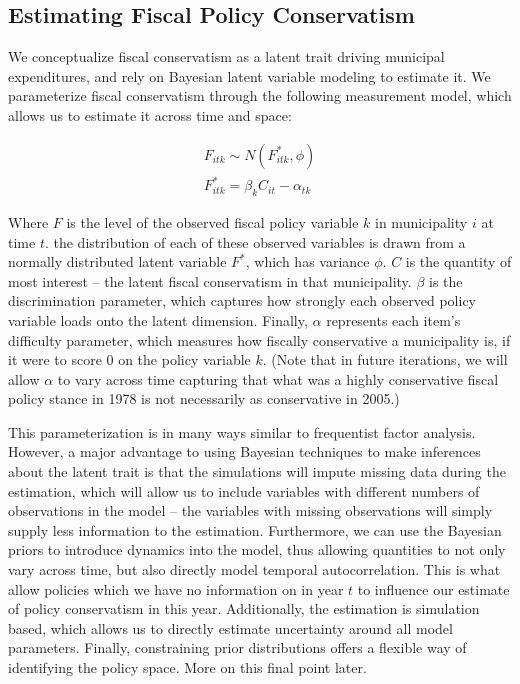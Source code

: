 \documentclass[a4paper,12pt]{article}
\begin{document}
\subsection*{Estimating Fiscal Policy Conservatism}
We conceptualize fiscal conservatism as a latent trait driving municipal expenditures, and rely on Bayesian latent variable modeling to estimate it. We parameterize fiscal conservatism through the following measurement model, which allows us to estimate it across time and space:

\begin{gather*}
F_{itk} \sim N(F^*_{itk}, \phi)\\
F^*_{itk} = \beta_k C_{it} - \alpha_{tk}
\end{gather*}

\noindent Where $F$ is the level of the observed fiscal policy variable $k$ in municipality $i$ at time $t$. the distribution of each of these observed variables is drawn from a normally distributed latent variable $F^*$, which has variance $\phi$. $C$ is the quantity of most interest -- the latent fiscal conservatism in that municipality. $\beta$ is the discrimination parameter, which captures how strongly each observed policy variable loads onto the latent dimension. Finally, $\alpha$ represents each item's difficulty parameter, which measures how fiscally conservative a municipality is, if it were to score 0 on the policy variable $k$. (Note that in future iterations, we will allow $\alpha$ to vary across time capturing that what was a highly conservative fiscal policy stance in 1978 is not necessarily as conservative in 2005.)

This parameterization is in many ways similar to frequentist factor analysis. However, a major advantage to using Bayesian techniques to make inferences about the latent trait is that the simulations will impute missing data during the estimation, which will allow us to include variables with different numbers of observations in the model -- the variables with missing observations will simply supply less information to the estimation. Furthermore, we can use the Bayesian priors to introduce dynamics into the model, thus allowing quantities to not only vary across time, but also directly model temporal autocorrelation. This is what allow policies which we have no information on in year $t$ to influence our estimate of policy conservatism in this year. Additionally, the estimation is simulation based, which allows us to directly estimate uncertainty around all model parameters. Finally, constraining prior distributions offers a flexible way of identifying the policy space. More on this final point later.
\end{document}
